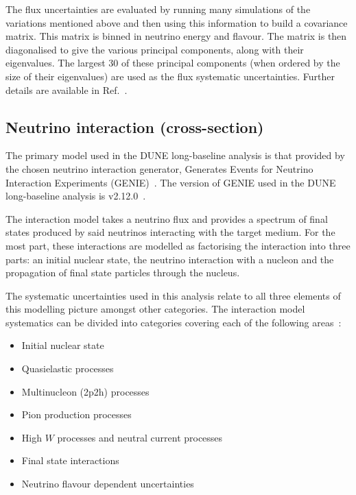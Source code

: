 The flux uncertainties are evaluated by running many simulations of the variations mentioned above and then using this information to build a covariance matrix.
This matrix is binned in neutrino energy and flavour.
The matrix is then diagonalised to give the various principal components, along with their eigenvalues.
The largest 30 of these principal components (when ordered by the size of their eigenvalues) are used as the flux systematic uncertainties.
Further details are available in Ref.~\cite{duneFluxUncertainties}.


\subsection{Neutrino interaction (cross-section)}
\label{sec:dune_lbl:systs:xsec}

The primary model used in the DUNE long-baseline analysis is that provided by the chosen neutrino interaction generator, Generates Events for Neutrino Interaction Experiments (GENIE)~\cite{genie}.
The version of GENIE used in the DUNE long-baseline analysis is v2.12.0~\cite{tdrVol2}.

The interaction model takes a neutrino flux and provides a spectrum of final states produced by said neutrinos interacting with the target medium.
For the most part, these interactions are modelled as factorising the interaction into three parts: an initial nuclear state, the neutrino interaction with a nucleon and the propagation of final state particles through the nucleus.


The systematic uncertainties used in this analysis relate to all three elements of this modelling picture amongst other categories.
The interaction model systematics can be divided into categories covering each of the following areas~\cite{tdrVol2}: 
\begin{itemize}
	\item Initial nuclear state
	\item Quasielastic processes
	\item Multinucleon (2p2h) processes
	\item Pion production processes
	\item High $W$ processes and neutral current processes
	\item Final state interactions
	\item Neutrino flavour dependent uncertainties
\end{itemize}

